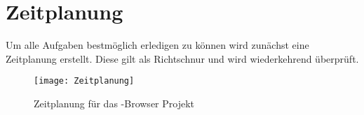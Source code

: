 \author{Gottfried von Recum}
\section{Zeitplanung}

Um alle Aufgaben bestmöglich erledigen zu können wird zunächst eine Zeitplanung erstellt. Diese gilt als Richtschnur und wird wiederkehrend überprüft.

\begin{figure}[h]
    \centering
    \texttt{[image: Zeitplanung]}
    \caption{Zeitplanung für das \SECH-Browser Projekt}
    \label{fig:Zeitplanung}
\end{figure}